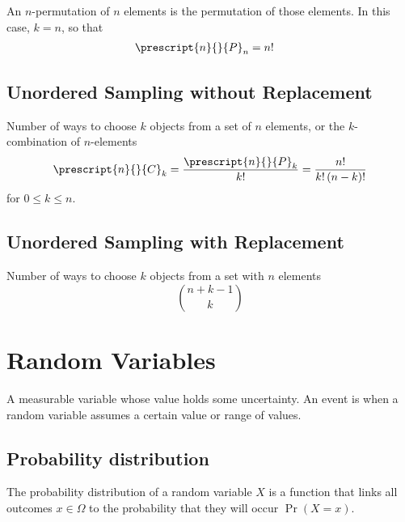 \documentclass{article}
\begin{document}
\begin{multicols}{3}
    An \(n\)-permutation of \(n\) elements is the permutation of those elements.
    In this case, \(k = n\), so that
    \begin{align*}
        \prescript{n}{}{P}_n & = n!
    \end{align*}
    \subsection{Unordered Sampling without Replacement}
    Number of ways to choose \(k\) objects from a set of \(n\) elements,
    or the \(k\)-combination of \(n\)-elements
    \begin{align*}
        \prescript{n}{}{C}_k = \frac{\prescript{n}{}{P}_k}{k!} = \frac{n!}{k! \left( n - k \right)!}
    \end{align*}
    for \(0 \leq k \leq n\).
    \subsection{Unordered Sampling with Replacement}
    Number of ways to choose \(k\) objects from a set with \(n\) elements
    \begin{equation*}
        \binom{n + k - 1}{k}
    \end{equation*}
    \section{Random Variables}
    A measurable variable whose value holds some uncertainty.
    An event is when a random variable assumes a certain value or range of values.
    \subsection{Probability distribution}
    The probability distribution of a random variable \(X\) is a function that links all outcomes \(x \in \Omega\)
    to the probability that they will occur \(\Pr{\left( X = x \right)}\).
\end{multicols}
\end{document}
